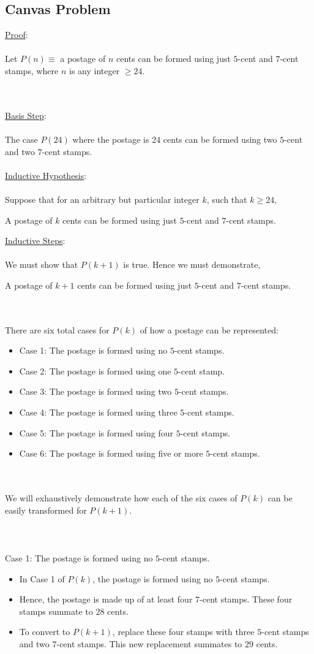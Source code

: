 \documentclass[12pt]{article}
\newcommand{\xlist}[1]{
    \begin{itemize}
        \renewcommand{\labelitemi}{$\centerdot$}
        #1
    \end{itemize}
    \newblock
    \\ \\
}
\newcommand{\xproof}[1]{
    \underline{Proof}:
    \\ \\
    #1
    \\ \\
}
\newcommand{\xbasisstep}{
    \underline{Basis Step}:
    \\ \\
}
\newcommand{\xinductivehypothesis}{
    \underline{Inductive Hypothesis}:
    \\ \\
}
\newcommand{\xinductivestep}{
    \underline{Inductive Steps}:
    \\ \\
}
\begin{document}
\subsection*{Canvas Problem}
\xproof{
    Let $P(n) \equiv$ a postage of $n$ cents can be formed using just $5$-cent and $7$-cent stamps, where $n$ is any integer $\geq 24$. 
}
\xbasisstep
The case $P(24)$ where the postage is 24 cents can be formed using two $5$-cent and two $7$-cent stamps. \\ \\
\xinductivehypothesis
Suppose that for an arbitrary but particular integer $k$, such that $k \geq 24$,
\begin{center}
    A postage of $k$ cents can be formed using just $5$-cent and $7$-cent stamps.
\end{center}
\xinductivestep
We must show that $P(k+1)$ is true. Hence we must demonstrate,
\begin{center}
    A postage of $k+1$ cents can be formed using just $5$-cent and $7$-cent stamps.
\end{center}
\newblock
\\ \\
There are six total cases for $P(k)$ of how a postage can be represented:
\xlist{
    \item Case 1: The postage is formed using no $5$-cent stamps.
    \item Case 2: The postage is formed using one $5$-cent stamp.
    \item Case 3: The postage is formed using two $5$-cent stamps.
    \item Case 4: The postage is formed using three $5$-cent stamps.
    \item Case 5: The postage is formed using four $5$-cent stamps.
    \item Case 6: The postage is formed using five or more $5$-cent stamps.
}
We will exhaustively demonstrate how each of the six cases of $P(k)$ can be easily transformed for $P(k+1)$.
\\ \\
\newblock
\\ \\ 
Case 1: The postage is formed using no $5$-cent stamps.
\xlist{
    \item In Case 1 of $P(k)$, the postage is formed using no $5$-cent stamps.
    \item Hence, the postage is made up of at least four $7$-cent stamps. These four stamps summate to $28$ cents.
    \item To convert to $P(k+1)$, replace these four stamps with three $5$-cent stamps and two $7$-cent stamps. This new replacement summates to $29$ cents.  
}
\end{document}
